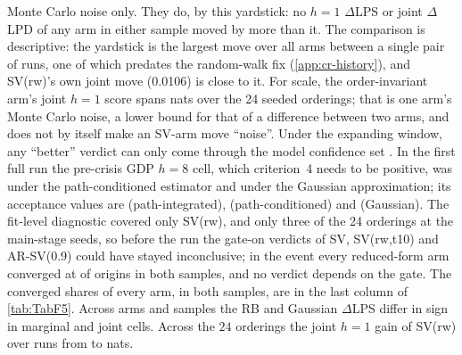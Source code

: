 Monte Carlo noise only. They do, by this yardstick: no $h = 1$ $\Delta$LPS or joint $\Delta$LPD of
any arm in either sample moved by more than it. The comparison is descriptive: the yardstick is the
largest move over all arms between a single pair of runs, one of which predates the random-walk fix
(\cref{app:cr-history}), and SV(rw)'s own joint move (0.0106) is close to it. For scale, the
order-invariant  arm's joint $h = 1$ score spans
 nats over the 24 seeded orderings; that is one
arm's Monte Carlo noise, a lower bound for that of a difference between two arms, and does not by
itself make an SV-arm move ``noise''. %
Under the expanding window, any ``better'' verdict can only come through the model confidence set
\citep{hansen2011model}.
In the first full run the pre-crisis GDP $h = 8$ cell, which criterion~4 needs to be positive, was
 under the path-conditioned estimator and  under the Gaussian
approximation; its acceptance values are
 (path-integrated),
 (path-conditioned) and
 (Gaussian).
The fit-level diagnostic covered only SV(rw), and only three of the 24 orderings at the main-stage
seeds, so before the run the gate-on verdicts of SV, SV(rw,t10) and AR-SV(0.9) could have stayed
inconclusive; in the event every reduced-form arm converged at  of origins in both
samples, and no verdict depends on the gate.
The converged shares of every arm, in both samples, are in the last column of \cref{tab:TabF5}. %
Across arms and samples the RB and Gaussian $\Delta$LPS differ in sign in
 marginal and
 joint cells. %
Across the $24$ orderings the joint $h = 1$ gain of SV(rw) over  runs from
 to  nats. %

